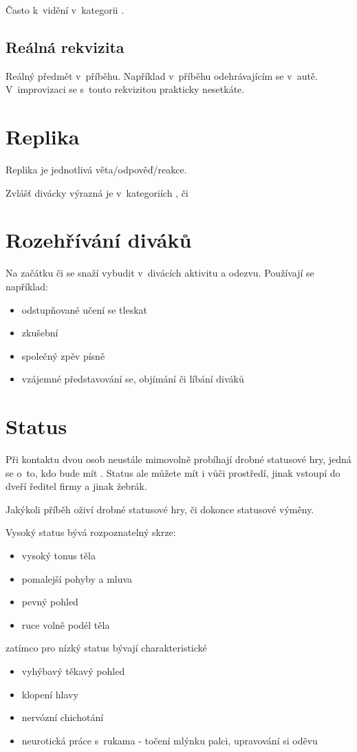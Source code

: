 Často k~vidění v~kategorii . 
 
\subsection{ Reálná rekvizita } Reálný předmět v~příběhu. Například   v~příběhu odehrávajícím se v~autě. V~improvizaci se s~touto rekvizitou prakticky nesetkáte. 
 
  
 
 
\needspace{5cm} \section{Replika} \label{replika} Replika je jednotlivá věta/odpověď/reakce. 
 
Zvlášť divácky výrazná je v~kategoriích ,  či  
 
\needspace{5cm} \section{Rozehřívání diváků} \label{rozehřívání diváků} Na začátku  či  se   snaží vybudit v~divácích aktivitu a odezvu. 
Používají se například: 
\begin{itemize}
\item odstupňované učení se tleskat
\item zkušební 
\item společný zpěv písně
\item vzájemné představování se, objímání či líbání diváků
\end{itemize}
 
 
\needspace{5cm} \section{Status} \label{status} Při kontaktu dvou osob neustále mimovolně probíhají drobné statusové hry, 
jedná se o~to, kdo bude mít  . Status ale můžete mít i vůči prostředí, jinak vstoupí do  
dveří ředitel firmy a jinak žebrák. 
 
Jakýkoli příběh oživí drobné statusové hry, či dokonce statusové výměny. 
 
 
Vysoký status bývá rozpoznatelný skrze: 
\begin{itemize}
\item vysoký tonus těla
\item pomalejší pohyby a mluva
\item pevný pohled
\item ruce volně podél těla
\end{itemize}
zatímco pro  nízký status bývají charakteristické 
\begin{itemize}
\item vyhýbavý těkavý pohled
\item klopení hlavy
\item nervózní chichotání
\item neurotická práce s~rukama - točení mlýnku palci, upravování si oděvu
\end{itemize}
 

